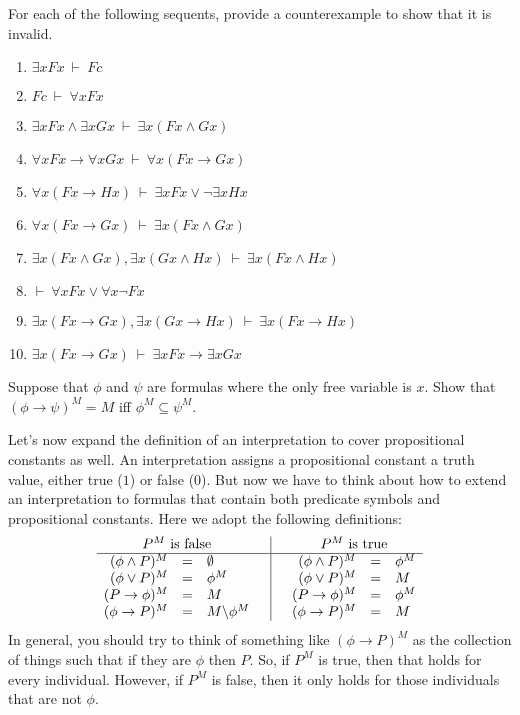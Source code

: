 \begin{exercises} 
  For each of the following sequents, provide a counterexample to show
  that it is invalid.
  \begin{enumerate}
  \item $\exists xFx\:\vdash \: Fc$
  \item $Fc\:\vdash \: \forall xFx$    
\item $\exists xFx\wedge\exists xGx\:\vdash\:\exists x(Fx\wedge Gx)$
\item $\forall xFx\to\forall xGx\:\vdash\:\forall x(Fx\to Gx)$
\item $\forall x(Fx\to Hx) \:\vdash\:\exists xFx\vee \neg
  \exists xHx$
\item $\forall x(Fx\to Gx)\:\vdash\:\exists x(Fx\wedge Gx)$
\item $\exists x(Fx\wedge Gx),\exists x(Gx\wedge Hx)\:\vdash\:\exists
  x(Fx\wedge Hx)$
\item $\vdash\:\forall xFx\vee \forall x\neg Fx$
\item $\exists x(Fx\to Gx),\exists x(Gx\to Hx)\:\vdash\:\exists
  x(Fx\to Hx)$
\item $\exists x(Fx\to Gx)\:\vdash\: \exists xFx\to \exists xGx$
\end{enumerate} \end{exercises}

\begin{exercise} Suppose that $\phi$ and $\psi$ are formulas where
   the only free variable is $x$.  Show that $(\phi\to \psi)^M=M$ iff
   $\phi ^M\subseteq \psi^M$.
 \end{exercise}

Let's now expand the definition of an interpretation to cover
propositional constants as well.  An interpretation assigns a propositional constant a truth value,
either true ($1$) or false ($0$).  But now we have to think about how
to extend an interpretation to formulas that contain both predicate
symbols and propositional constants.  Here we adopt the following
definitions:
\[ \begin{array}{r c l c | c r c l}
     \multicolumn{3}{c}{\text{$P^M$ is false}} & & & \multicolumn{3}{c}{\text{$P^M$ is true}} \\
     \hline
     (\phi \wedge P)^M &= & \emptyset & & &  (\phi \wedge P)^M &=& \phi
                                   ^M  \\
     (\phi\vee P)^M &=& \phi ^M & & &  (\phi\vee P)^M &=& M \\
     (P\to \phi )^M &=& M       & & &  (P\to \phi )^M &=& \phi ^M \\
     (\phi\to P)^M &=& M\backslash \phi ^M & & &  (\phi\to P)^M& =& M 
   \end{array} \]
 In general, you should try to think of something like $(\phi\to P)^M$
 as the collection of things such that if they are $\phi$ then $P$.
 So, if $P^M$ is true, then that holds for every individual.
 However, if $P^M$ is false, then it only holds for those individuals
 that are not $\phi$.  

